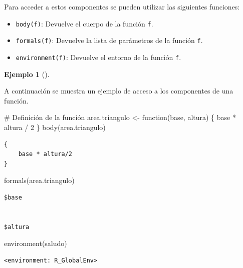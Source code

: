 \documentclass[
  a4paper,
]{scrreport}
\newenvironment{Shaded}{\begin{snugshade}}{\end{snugshade}}
\newcommand{\CommentTok}[1]{\textcolor[rgb]{0.37,0.37,0.37}{#1}}
\newcommand{\ControlFlowTok}[1]{\textcolor[rgb]{0.00,0.23,0.31}{#1}}
\newcommand{\DecValTok}[1]{\textcolor[rgb]{0.68,0.00,0.00}{#1}}
\newcommand{\FunctionTok}[1]{\textcolor[rgb]{0.28,0.35,0.67}{#1}}
\newcommand{\NormalTok}[1]{\textcolor[rgb]{0.00,0.23,0.31}{#1}}
\newcommand{\OtherTok}[1]{\textcolor[rgb]{0.00,0.23,0.31}{#1}}
\newcommand{\SpecialCharTok}[1]{\textcolor[rgb]{0.37,0.37,0.37}{#1}}
\providecommand{\tightlist}{%
  \setlength{\itemsep}{0pt}\setlength{\parskip}{0pt}}\usepackage{longtable,booktabs,array}
\theoremstyle{definition}
\newtheorem{example}{Ejemplo}[chapter]
\theoremstyle{definition}
\theoremstyle{remark}
\begin{document}
Para acceder a estos componentes se pueden utilizar las siguientes
funciones:

\begin{itemize}
\tightlist
\item
  \texttt{body(f)}: Devuelve el cuerpo de la función \texttt{f}.
\item
  \texttt{formals(f)}: Devuelve la lista de parámetros de la función
  \texttt{f}.
\item
  \texttt{environment(f)}: Devuelve el entorno de la función \texttt{f}.
\end{itemize}

\leavevmode{}%
\begin{example}[]\label{exm-componentes-funcion}

A continuación se muestra un ejemplo de acceso a los componentes de una
función.

\begin{Shaded}
\begin{Highlighting}[]
\CommentTok{\# Definición de la función}
\NormalTok{area.triangulo }\OtherTok{\textless{}{-}} \ControlFlowTok{function}\NormalTok{(base, altura) \{}
\NormalTok{  base }\SpecialCharTok{*}\NormalTok{ altura }\SpecialCharTok{/} \DecValTok{2}
\NormalTok{\}}
\FunctionTok{body}\NormalTok{(area.triangulo)}
\end{Highlighting}
\end{Shaded}

\begin{verbatim}
{
    base * altura/2
}
\end{verbatim}

\begin{Shaded}
\begin{Highlighting}[]
\FunctionTok{formals}\NormalTok{(area.triangulo)}
\end{Highlighting}
\end{Shaded}

\begin{verbatim}
$base


$altura
\end{verbatim}

\begin{Shaded}
\begin{Highlighting}[]
\FunctionTok{environment}\NormalTok{(saludo)}
\end{Highlighting}
\end{Shaded}

\begin{verbatim}
<environment: R_GlobalEnv>
\end{verbatim}

\end{example}
\end{document}
